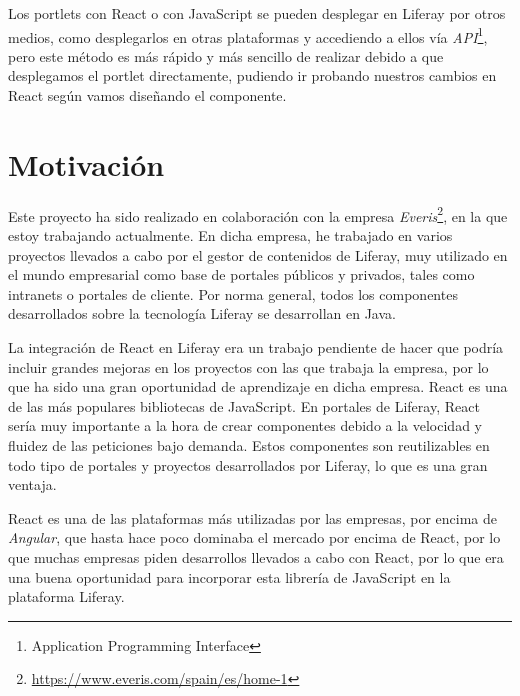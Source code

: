 \documentclass[a4paper, 12pt]{book}
\begin{document}
\vspace{5mm} %
Los portlets con React o con JavaScript se pueden desplegar en Liferay por otros medios, como desplegarlos en otras plataformas y accediendo a ellos vía \textit{API}\footnote{Application Programming Interface}, pero este método es más rápido y más sencillo de realizar debido a que desplegamos el portlet directamente, pudiendo ir probando nuestros cambios en React según vamos diseñando el componente.


\section{Motivaci\'on}
\label{sec:motivacion}
Este proyecto ha sido realizado en colaboración con la empresa \textit{Everis}\footnote{\url{https://www.everis.com/spain/es/home-1}}, en la que estoy trabajando actualmente. En dicha empresa, he trabajado en varios proyectos llevados a cabo por el gestor de contenidos de Liferay, muy utilizado en el mundo empresarial como base de portales públicos y privados, tales como intranets o portales de cliente. Por norma general, todos los componentes desarrollados sobre la tecnología Liferay se desarrollan en Java.

\vspace{5mm} %
La integración de React en Liferay era un trabajo pendiente de hacer que podría incluir grandes mejoras en los proyectos con las que trabaja la empresa, por lo que ha sido una gran oportunidad de aprendizaje en dicha empresa. React es una de las más populares bibliotecas de JavaScript. En portales de Liferay, React sería muy importante a la hora de crear componentes debido a la velocidad y fluidez de las peticiones bajo demanda. Estos componentes son reutilizables en todo tipo de portales y proyectos desarrollados por Liferay, lo que es una gran ventaja.

\vspace{5mm} %
React es una de las plataformas más utilizadas por las empresas, por encima de \textit{Angular}, que hasta hace poco dominaba el mercado por encima de React, por lo que muchas empresas piden desarrollos llevados a cabo con React, por lo que era una buena oportunidad para incorporar esta librería de JavaScript en la plataforma Liferay.
\end{document}
